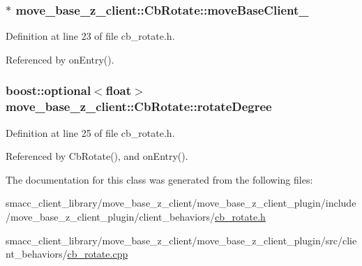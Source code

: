 \subsubsection[{\texorpdfstring{move\+Base\+Client\+\_\+}{moveBaseClient_}}]{$\ast$ move\+\_\+base\+\_\+z\+\_\+client\+::\+Cb\+Rotate\+::move\+Base\+Client\+\_\+}\hypertarget{classmove__base__z__client_1_1CbRotate_a292c3739c4c1e668c0c6e241127b5c50}{}\label{classmove__base__z__client_1_1CbRotate_a292c3739c4c1e668c0c6e241127b5c50}


Definition at line 23 of file cb\+\_\+rotate.\+h.



Referenced by on\+Entry().

\subsubsection[{\texorpdfstring{rotate\+Degree}{rotateDegree}}]{\setlength{\rightskip}{0pt plus 5cm}boost\+::optional$<$float$>$ move\+\_\+base\+\_\+z\+\_\+client\+::\+Cb\+Rotate\+::rotate\+Degree}\hypertarget{classmove__base__z__client_1_1CbRotate_a30d0f24b857149d78a023635562516b6}{}\label{classmove__base__z__client_1_1CbRotate_a30d0f24b857149d78a023635562516b6}


Definition at line 25 of file cb\+\_\+rotate.\+h.



Referenced by Cb\+Rotate(), and on\+Entry().



The documentation for this class was generated from the following files\+:\begin{DoxyCompactItemize}
\item 
smacc\+\_\+client\+\_\+library/move\+\_\+base\+\_\+z\+\_\+client/move\+\_\+base\+\_\+z\+\_\+client\+\_\+plugin/include/move\+\_\+base\+\_\+z\+\_\+client\+\_\+plugin/client\+\_\+behaviors/\hyperlink{cb__rotate_8h}{cb\+\_\+rotate.\+h}\item 
smacc\+\_\+client\+\_\+library/move\+\_\+base\+\_\+z\+\_\+client/move\+\_\+base\+\_\+z\+\_\+client\+\_\+plugin/src/client\+\_\+behaviors/\hyperlink{cb__rotate_8cpp}{cb\+\_\+rotate.\+cpp}\end{DoxyCompactItemize}
